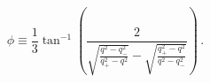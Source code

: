 \begin{equation}
\phi\equiv\frac{1}{3}\tan^{-1}\left(\frac{2}
{\sqrt{\frac{q^2-q_-^2}{q_+^2-q^2}}-
\sqrt{\frac{q_+^2-q^2}{q^2-q_-^2}}}\right)\,.
\end{equation}

